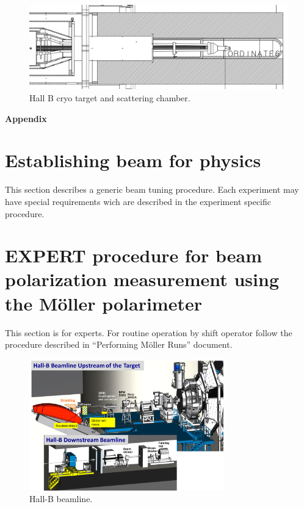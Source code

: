 \documentclass[12pt]{article}
\begin{document}
\begin{figure}[ht!]
\centering
\includegraphics[width=1.\textwidth]{target.pdf}
\caption{Hall B cryo target and scattering chamber. }%
\label{target}
\end{figure}

\clearpage

\begin{flushleft}
{\bf {\Large Appendix}}
\end{flushleft}

\section {Establishing beam for physics}
This section describes a generic beam tuning procedure. Each experiment may have special requirements wich are described in the experiment specific procedure.



\section{EXPERT procedure for beam polarization measurement using the M{\"o}ller polarimeter}
This section is for experts. For routine operation by shift operator follow the procedure described in ``Performing M{\"o}ller Runs'' document.


\begin{figure}[htb]
\centering
\includegraphics[angle=90,width=0.75\textwidth]{beamline_rendaring.pdf}
\caption{Hall-B beamline.}
\label{fig:bline}
\end{figure}
\end{document}
